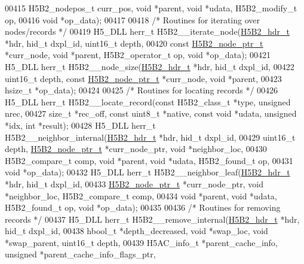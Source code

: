 \begin{DoxyCode}
{{00415     H5B2\_nodepos\_t curr\_pos, \textcolor{keywordtype}{void} *parent, \textcolor{keywordtype}{void} *udata, H5B2\_modify\_t op,
00416     \textcolor{keywordtype}{void} *op\_data);
00417 
00418 \textcolor{comment}{/* Routines for iterating over nodes/records */}
00419 H5\_DLL herr\_t H5B2\_\_iterate\_node(\hyperlink{struct_h5_b2__hdr__t}{H5B2\_hdr\_t} *hdr, hid\_t dxpl\_id, uint16\_t depth,
00420     \textcolor{keyword}{const} \hyperlink{struct_h5_b2__node__ptr__t}{H5B2\_node\_ptr\_t} *curr\_node, \textcolor{keywordtype}{void} *parent, H5B2\_operator\_t op, \textcolor{keywordtype}{void} *op\_data);
00421 H5\_DLL herr\_t H5B2\_\_node\_size(\hyperlink{struct_h5_b2__hdr__t}{H5B2\_hdr\_t} *hdr, hid\_t dxpl\_id,
00422     uint16\_t depth, \textcolor{keyword}{const} \hyperlink{struct_h5_b2__node__ptr__t}{H5B2\_node\_ptr\_t} *curr\_node, \textcolor{keywordtype}{void} *parent,
00423     hsize\_t *op\_data);
00424 
00425 \textcolor{comment}{/* Routines for locating records */}
00426 H5\_DLL herr\_t H5B2\_\_locate\_record(\textcolor{keyword}{const} H5B2\_class\_t *type, \textcolor{keywordtype}{unsigned} nrec,
00427     \textcolor{keywordtype}{size\_t} *rec\_off, \textcolor{keyword}{const} uint8\_t *native, \textcolor{keyword}{const} \textcolor{keywordtype}{void} *udata, \textcolor{keywordtype}{unsigned} *idx, \textcolor{keywordtype}{int} *result);
00428 H5\_DLL herr\_t H5B2\_\_neighbor\_internal(\hyperlink{struct_h5_b2__hdr__t}{H5B2\_hdr\_t} *hdr, hid\_t dxpl\_id,
00429     uint16\_t depth, \hyperlink{struct_h5_b2__node__ptr__t}{H5B2\_node\_ptr\_t} *curr\_node\_ptr, \textcolor{keywordtype}{void} *neighbor\_loc,
00430     H5B2\_compare\_t comp, \textcolor{keywordtype}{void} *parent, \textcolor{keywordtype}{void} *udata, H5B2\_found\_t op,
00431     \textcolor{keywordtype}{void} *op\_data);
00432 H5\_DLL herr\_t H5B2\_\_neighbor\_leaf(\hyperlink{struct_h5_b2__hdr__t}{H5B2\_hdr\_t} *hdr, hid\_t dxpl\_id,
00433     \hyperlink{struct_h5_b2__node__ptr__t}{H5B2\_node\_ptr\_t} *curr\_node\_ptr, \textcolor{keywordtype}{void} *neighbor\_loc, H5B2\_compare\_t comp,
00434     \textcolor{keywordtype}{void} *parent, \textcolor{keywordtype}{void} *udata, H5B2\_found\_t op, \textcolor{keywordtype}{void} *op\_data);
00435 
00436 \textcolor{comment}{/* Routines for removing records */}
00437 H5\_DLL herr\_t H5B2\_\_remove\_internal(\hyperlink{struct_h5_b2__hdr__t}{H5B2\_hdr\_t} *hdr, hid\_t dxpl\_id,
00438     hbool\_t *depth\_decreased, \textcolor{keywordtype}{void} *swap\_loc, \textcolor{keywordtype}{void} *swap\_parent, uint16\_t depth,
00439     H5AC\_info\_t *parent\_cache\_info, \textcolor{keywordtype}{unsigned} *parent\_cache\_info\_flags\_ptr,
}}
\end{DoxyCode}
